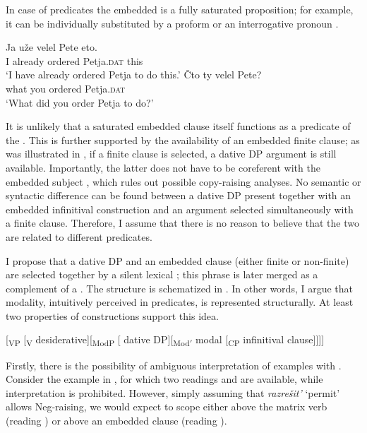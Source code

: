 \documentclass[output=paper,colorlinks,citecolor=brown,newtxmath]{langsci/langscibook}
\begin{document}
In case of  predicates the embedded  is a fully saturated proposition; for example, it can be individually substituted by a proform  or an interrogative pronoun .

\ea\label{ex13}
\ea\label{ex13a}
\gll Ja uže velel Pete eto.\\
    I already ordered Petja.\textsc{dat} this\\
\glt `I have already ordered Petja to do this.'
\ex\label{ex13b}
\gll Čto ty velel Pete?\\
    what you ordered Petja.\textsc{dat}\\
\glt `What did you order Petja to do?'
\z
\z

\noindent It is unlikely that a saturated embedded clause itself functions as a predicate of the . This is further supported by the availability of an embedded finite clause; as was illustrated in , if a finite  clause is selected, a dative DP argument is still available. Importantly, the latter does not have to be coreferent with the embedded subject , which rules out possible copy-raising analyses. No semantic or syntactic difference can be found between a dative DP present together with an embedded infinitival construction and an argument selected simultaneously with a finite clause. Therefore, I assume that there is no reason to believe that the two are related to different predicates. \par

I propose that a dative DP and an embedded clause (either finite or non-finite) are selected together by a silent lexical ; this  phrase is later merged as a complement of a . The structure is schematized in . In other words, I argue that  modality, intuitively perceived in  predicates, is represented structurally. At least two properties of  constructions support this idea.

\ea
\label{ex14}
{[\textsubscript{VP} [\textsubscript{V} desiderative][\textsubscript{ModP} [\hspace{-2pt} dative DP][\textsubscript{Mod$'$} modal [\textsubscript{CP} infinitival clause]]]]}
\z

\noindent Firstly, there is the possibility of ambiguous interpretation of examples with . Consider the example in , for which two readings  and  are available, while interpretation  is prohibited. However, simply assuming that \textit{razrešit’} `permit’ allows Neg-raising, we would expect  to scope either above the matrix verb (reading ) or above an embedded clause (reading ).
\end{document}
